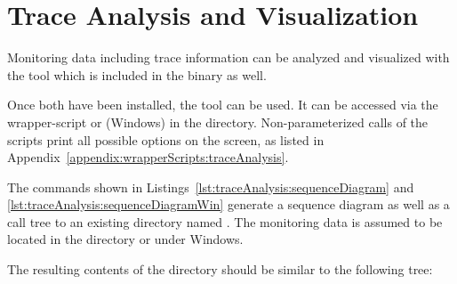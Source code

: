\section{Trace Analysis and Visualization}\label{sec:traceAnalysisTool}

\enlargethispage{1.5cm}

Monitoring data including trace information can be analyzed and visualized with %
the \KiekerTraceAnalysis{} tool which is included in the \Kieker{} binary as well.\\

 \vspace{3mm}

\noindent Once both have been installed, the \KiekerTraceAnalysis{} tool can be %
used. It can be accessed via the wrapper-script  or %
 (Windows) in the  directory. %
Non-parameterized calls of the scripts print all possible options on the screen, %
as listed in Appendix~\ref{appendix:wrapperScripts:traceAnalysis}.

The commands shown in Listings~\ref{lst:traceAnalysis:sequenceDiagram} and \ref{lst:traceAnalysis:sequenceDiagramWin} generate a sequence diagram as well %
as a call tree to an existing directory named . The monitoring data %
is assumed to be located in the directory %
 or  under Windows. %

\setBashListing



The resulting contents of the  directory should be similar to %
the following tree: 

